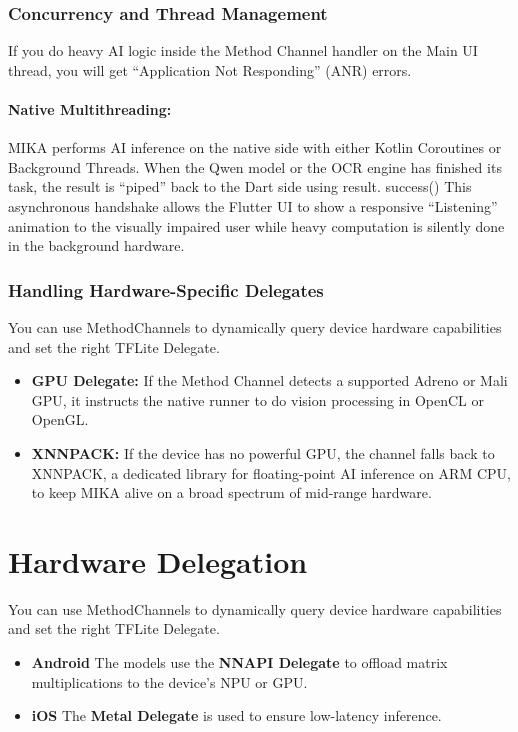\documentclass[12pt,a4paper]{report}
\begin{document}
\subsubsection{Concurrency and Thread Management}
If you do heavy AI logic inside the Method Channel handler on the Main UI thread, you will get “Application Not Responding” (ANR) errors. 

\paragraph{Native Multithreading:} 
MIKA performs AI inference on the native side with either Kotlin Coroutines or Background Threads. When the Qwen model or the OCR engine has finished its task, the result is “piped” back to the Dart side using result. success() This asynchronous handshake allows the Flutter UI to show a responsive “Listening” animation to the visually impaired user while heavy computation is silently done in the background hardware.
 
\subsubsection{Handling Hardware-Specific Delegates}
You can use MethodChannels to dynamically query device hardware capabilities and set the right TFLite Delegate.
\begin{itemize}
    \item \textbf{GPU Delegate:} If the Method Channel detects a supported Adreno or Mali GPU, it instructs the native runner to do vision processing in OpenCL or OpenGL. 
    \item \textbf{XNNPACK:} If the device has no powerful GPU, the channel falls back to XNNPACK, a dedicated library for floating-point AI inference on ARM CPU, to keep MIKA alive on a broad spectrum of mid-range hardware.
\end{itemize}
 

\section{Hardware Delegation}
You can use MethodChannels to dynamically query device hardware capabilities and set the right TFLite Delegate.
 
\begin{itemize}
    \item[1.] \textbf{Android} The models use the \textbf{NNAPI Delegate} to offload matrix multiplications to the device's NPU or GPU.
    \item[2.] \textbf{iOS} The \textbf{Metal Delegate} is used to ensure low-latency inference.
\end{itemize}
 
\end{document}
